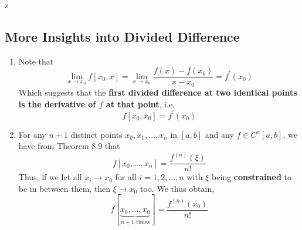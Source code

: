 z\documentclass[a4paper,12pt,twoside]{book}
\begin{document}
\subsection{More Insights into Divided Difference}
\begin{enumerate}
    \item {Note that 
    \[ \underset{x\to x_0}{\lim} f[x_0,x] = \underset{x\to x_0}{\lim} \frac{f(x) - f(x_0)}{x-x_0} = f^\prime(x_0) \]
    Which suggests that the \textbf{first divided difference at two identical points is the derivative of $f$ at that point}, i.e.
    \[f[x_0,x_0] = f^\prime(x_0)\]
    }
    \item{For any $n+1$ distinct points $x_0,x_1,\dots,x_n$ in $[a,b]$ and any $f\in C^{n}[a,b]$, we have from Theorem 8.9 that
    \[f[x_0,\dots, x_n] = \frac{f^{(n)}(\xi)}{n!}\]
    Thus, if we let all $x_i \to x_0$ for all $i = 1,2,\dots,n$ with $\xi$ being \textbf{constrained} to be in between them, then $\xi \to x_0$ too. We thus obtain,
    \begin{equation}
     \boxed{   f[\underbrace{x_0,\dots,x_0}_{\text{$n+1$ times}}] = \frac{f^{(n)}(x_0)}{n!} }
    \end{equation}
    }
\end{enumerate}
\end{document}
